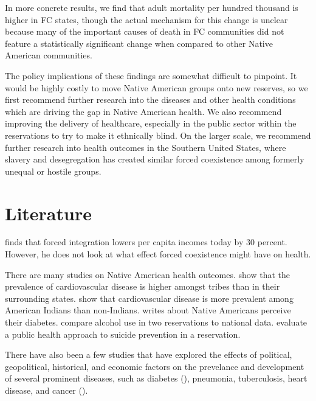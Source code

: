 \documentclass[12pt]{article}
\begin{document}
In more concrete results, we find that adult mortality per hundred thousand is higher in FC states, though the actual mechanism for this change is unclear because many of the important causes of death in FC communities did not feature a statistically significant change when compared to other Native American communities.

The policy implications of these findings are somewhat difficult to pinpoint.  
It would be highly costly to move Native American groups onto new reserves, so we first recommend further research into the diseases and other health conditions which are driving the gap in Native American health. 
We also recommend improving the delivery of healthcare, especially in the public sector within the reservations to try to make it ethnically blind. 
On the larger scale, we recommend further research into health outcomes in the Southern United States, where slavery and desegregation has created similar forced coexistence among formerly unequal or hostile groups.  


\section{Literature}
\cite{dippel2010forced} finds that forced integration lowers per capita incomes today by 30 percent. However, he does not look at what effect forced coexistence might have on health.

There are many studies on Native American health outcomes. 
\cite{levin2002geographic} show that the prevalence of cardiovascular disease is higher amongst tribes than in their surrounding states.
\cite{harwell2001cardiovascular} show that cardiovascular disease is more prevalent among American Indians than non-Indians.
\cite{patel2013health} writes about Native Americans perceive their diabetes.
\cite{beals2003racial} compare alcohol use in two reservations to national data.
\cite{may2005outcome} evaluate a public health approach to suicide prevention in a reservation.

There have also been a few studies that have explored the effects of political, geopolitical, historical, and economic factors on the prevelance and development of several prominent diseases, such as diabetes (\cite{patchell2014role}), pneumonia, tuberculosis, heart disease, and cancer (\cite{heiner2014demographic}).
\end{document}
